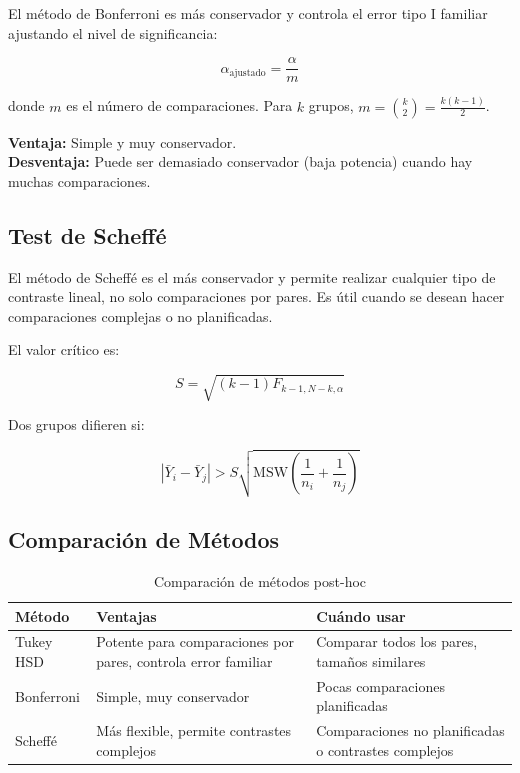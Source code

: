 \documentclass[11pt,a4paper]{article}
\theoremstyle{definition}
\begin{document}
El método de Bonferroni es más conservador y controla el error tipo I familiar ajustando el nivel de significancia:

\begin{equation}
\alpha_{\text{ajustado}} = \frac{\alpha}{m}
\end{equation}

donde $m$ es el número de comparaciones. Para $k$ grupos, $m = \binom{k}{2} = \frac{k(k-1)}{2}$.

\textbf{Ventaja:} Simple y muy conservador. \\
\textbf{Desventaja:} Puede ser demasiado conservador (baja potencia) cuando hay muchas comparaciones.

\subsection{Test de Scheffé}

El método de Scheffé es el más conservador y permite realizar cualquier tipo de contraste lineal, no solo comparaciones por pares. Es útil cuando se desean hacer comparaciones complejas o no planificadas.

El valor crítico es:

\begin{equation}
S = \sqrt{(k-1) F_{k-1, N-k, \alpha}}
\end{equation}

Dos grupos difieren si:

\begin{equation}
|\bar{Y}_i - \bar{Y}_j| > S \sqrt{\text{MSW} \left(\frac{1}{n_i} + \frac{1}{n_j}\right)}
\end{equation}

\subsection{Comparación de Métodos}

\begin{table}[H]
\centering
\small
\begin{tabular}{lp{5cm}p{5cm}}
\toprule
Método & Ventajas & Cuándo usar \\
\midrule
Tukey HSD & Potente para comparaciones por pares, controla error familiar & Comparar todos los pares, tamaños similares \\
Bonferroni & Simple, muy conservador & Pocas comparaciones planificadas \\
Scheffé & Más flexible, permite contrastes complejos & Comparaciones no planificadas o contrastes complejos \\
\bottomrule
\end{tabular}
\caption{Comparación de métodos post-hoc}
\end{table}
\end{document}
